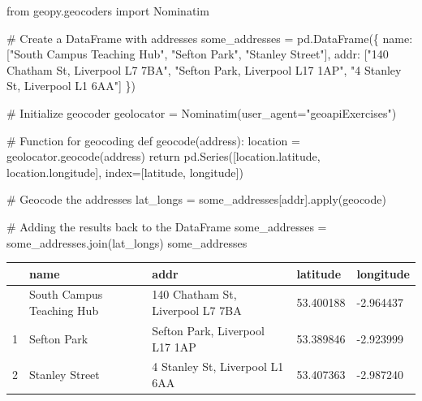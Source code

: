 \documentclass[
  letterpaper,
  DIV=11,
  numbers=noendperiod]{scrreprt}
\newenvironment{Shaded}{\begin{snugshade}}{\end{snugshade}}
\newcommand{\BuiltInTok}[1]{\textcolor[rgb]{0.00,0.23,0.31}{#1}}
\newcommand{\CommentTok}[1]{\textcolor[rgb]{0.37,0.37,0.37}{#1}}
\newcommand{\ControlFlowTok}[1]{\textcolor[rgb]{0.00,0.23,0.31}{#1}}
\newcommand{\ImportTok}[1]{\textcolor[rgb]{0.00,0.46,0.62}{#1}}
\newcommand{\KeywordTok}[1]{\textcolor[rgb]{0.00,0.23,0.31}{#1}}
\newcommand{\NormalTok}[1]{\textcolor[rgb]{0.00,0.23,0.31}{#1}}
\newcommand{\OperatorTok}[1]{\textcolor[rgb]{0.37,0.37,0.37}{#1}}
\newcommand{\StringTok}[1]{\textcolor[rgb]{0.13,0.47,0.30}{#1}}
\begin{document}
\begin{Shaded}
\begin{Highlighting}[]
\ImportTok{from}\NormalTok{ geopy.geocoders }\ImportTok{import}\NormalTok{ Nominatim}

\CommentTok{\# Create a DataFrame with addresses}
\NormalTok{some\_addresses }\OperatorTok{=}\NormalTok{ pd.DataFrame(\{}
    \StringTok{\textquotesingle{}name\textquotesingle{}}\NormalTok{: [}\StringTok{"South Campus Teaching Hub"}\NormalTok{, }\StringTok{"Sefton Park"}\NormalTok{, }\StringTok{"Stanley Street"}\NormalTok{],}
    \StringTok{\textquotesingle{}addr\textquotesingle{}}\NormalTok{: [}\StringTok{"140 Chatham St, Liverpool L7 7BA"}\NormalTok{, }\StringTok{"Sefton Park, Liverpool L17 1AP"}\NormalTok{, }\StringTok{"4 Stanley St, Liverpool L1 6AA"}\NormalTok{]}
\NormalTok{\})}

\CommentTok{\# Initialize geocoder}
\NormalTok{geolocator }\OperatorTok{=}\NormalTok{ Nominatim(user\_agent}\OperatorTok{=}\StringTok{"geoapiExercises"}\NormalTok{)}

\CommentTok{\# Function for geocoding}
\KeywordTok{def}\NormalTok{ geocode(address):}
\NormalTok{    location }\OperatorTok{=}\NormalTok{ geolocator.geocode(address)}
    \ControlFlowTok{return}\NormalTok{ pd.Series([location.latitude, location.longitude], index}\OperatorTok{=}\NormalTok{[}\StringTok{\textquotesingle{}latitude\textquotesingle{}}\NormalTok{, }\StringTok{\textquotesingle{}longitude\textquotesingle{}}\NormalTok{])}

\CommentTok{\# Geocode the addresses}
\NormalTok{lat\_longs }\OperatorTok{=}\NormalTok{ some\_addresses[}\StringTok{\textquotesingle{}addr\textquotesingle{}}\NormalTok{].}\BuiltInTok{apply}\NormalTok{(geocode)}

\CommentTok{\# Adding the results back to the DataFrame}
\NormalTok{some\_addresses }\OperatorTok{=}\NormalTok{ some\_addresses.join(lat\_longs)}
\NormalTok{some\_addresses}
\end{Highlighting}
\end{Shaded}

\begin{longtable}[]{@{}lllll@{}}
\toprule\noalign{}
& name & addr & latitude & longitude \\
\midrule\noalign{}
\endhead
\bottomrule\noalign{}
\endlastfoot
0 & South Campus Teaching Hub & 140 Chatham St, Liverpool L7 7BA &
53.400188 & -2.964437 \\
1 & Sefton Park & Sefton Park, Liverpool L17 1AP & 53.389846 &
-2.923999 \\
2 & Stanley Street & 4 Stanley St, Liverpool L1 6AA & 53.407363 &
-2.987240 \\
\end{longtable}
\end{document}
